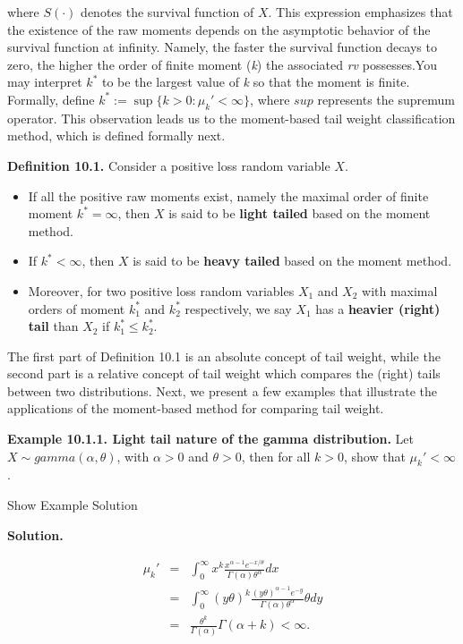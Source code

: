 \documentclass[]{book}
\providecommand{\tightlist}{%
  \setlength{\itemsep}{0pt}\setlength{\parskip}{0pt}}
\theoremstyle{definition}
\theoremstyle{definition}
\theoremstyle{definition}
\theoremstyle{remark}
\begin{document}
where \(S(\cdot)\) denotes the survival function of \(X\). This
expression emphasizes that the existence of the raw moments depends on
the asymptotic behavior of the survival function at infinity. Namely,
the faster the survival function decays to zero, the higher the order of
finite moment (\emph{k}) the associated \emph{rv} possesses.You may
interpret \(k^{\ast}\) to be the largest value of \emph{k} so that the
moment is finite. Formally, define
\(k^{\ast}:=\sup\{k > 0:\mu_k'<\infty \}\), where \(sup\) represents the
supremum operator. This observation leads us to the moment-based tail
weight classification method, which is defined formally next.

\textbf{Definition 10.1.} Consider a positive loss random variable
\(X\).

\begin{itemize}
\tightlist
\item
  If all the positive raw moments exist, namely the maximal order of
  finite moment \(k^{\ast}=\infty\), then \(X\) is said to be
  \textbf{light tailed} based on the moment method.
\item
  If \(k^{\ast} < \infty\), then \(X\) is said to be \textbf{heavy
  tailed} based on the moment method.
\item
  Moreover, for two positive loss random variables \(X_1\) and \(X_2\)
  with maximal orders of moment \(k^{\ast}_1\) and \(k^{\ast}_2\)
  respectively, we say \(X_1\) has a \textbf{heavier (right) tail} than
  \(X_2\) if \(k^{\ast}_1\leq k^{\ast}_2\).
\end{itemize}

The first part of Definition 10.1 is an absolute concept of tail weight,
while the second part is a relative concept of tail weight which
compares the (right) tails between two distributions. Next, we present a
few examples that illustrate the applications of the moment-based method
for comparing tail weight.

\textbf{Example 10.1.1. Light tail nature of the gamma distribution.}
Let \(X\sim gamma(\alpha,\theta)\), with \(\alpha>0\) and \(\theta>0\),
then for all \(k>0\), show that \(\mu_k' < \infty\).

Show Example Solution

\hypertarget{toggleExamplePortMgt.1.1}{}
\textbf{Solution.}

\begin{eqnarray*}
    \mu_k' &=& \int_0^{\infty} x^k \frac{x^{\alpha-1} e^{-x/\theta}}{\Gamma(\alpha) \theta^{\alpha}} dx \\
    &=& \int_0^{\infty} (y\theta)^k  \frac{(y\theta)^{\alpha-1} e^{-y}}{\Gamma(\alpha) \theta^{\alpha}} \theta dy \\
    &=& \frac{\theta^k}{\Gamma(\alpha)} \Gamma(\alpha+k) < \infty.
\end{eqnarray*}
\end{document}
